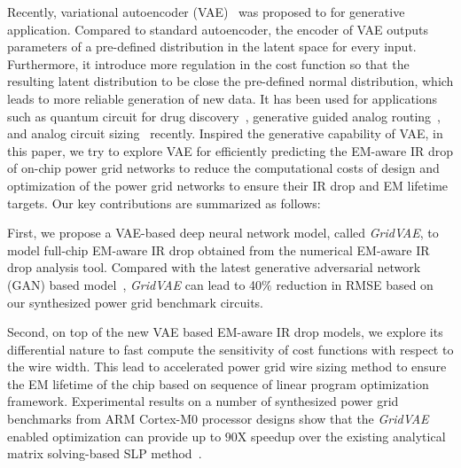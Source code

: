    
Recently, variational autoencoder (VAE)~\cite{Diederik:arxiv'22} was proposed to for generative application. Compared to standard autoencoder, the encoder of VAE outputs parameters of a pre-defined distribution in the latent space for every input. Furthermore, it introduce more regulation in the cost function so that the resulting latent distribution to be close the pre-defined normal distribution, which leads to more reliable generation of new data. It has been used for applications such as quantum circuit for drug discovery~\cite{Li:DATE'22}, generative guided analog routing~\cite{Zhu:ICCAD'19}, and analog circuit sizing~\cite{Touloupas:SMACD'22} recently.
Inspired the generative capability of VAE, in this paper, we try to explore VAE for efficiently predicting the EM-aware IR drop of on-chip power grid networks to reduce the computational costs of design and optimization of  the power grid networks to ensure their IR drop and EM lifetime targets.  Our key contributions are summarized as follows:

\begin{itemlist}
\item First, we propose a VAE-based deep neural network model, called {\it GridVAE}, to model full-chip EM-aware IR drop obtained from the numerical EM-aware IR drop analysis tool.  Compared with the latest generative adversarial network (GAN) based model~\cite{ZhouJin:ICCAD'20}, {\it GridVAE} can lead to 40$\%$ reduction in RMSE based on our synthesized power grid benchmark circuits.

\item Second, on top of the new VAE based EM-aware IR drop models, we explore its differential nature to fast compute the sensitivity of cost functions with respect to the wire width. This lead to accelerated power grid wire sizing method to ensure the EM lifetime of the chip based on sequence of linear program optimization framework. Experimental results on a number of synthesized power grid benchmarks from ARM Cortex-M0 processor designs show that the {\it GridVAE} enabled optimization can provide up to $90$X speedup over the existing analytical matrix solving-based SLP method~\cite{Sukharev:2019pg}.
 
\end{itemlist}

